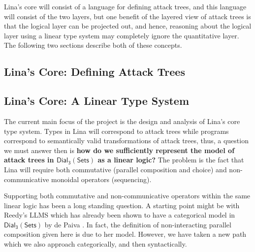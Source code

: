 \documentclass{sigplanconf}
\newcommand{\dial}[0]{\mathsf{Dial_3}(\mathsf{Sets})}
\begin{document}
Lina's core will consist of a language for defining attack trees, and
this language will consist of the two layers, but one benefit of the
layered view of attack trees is that the logical layer can be
projected out, and hence, reasoning about the logical layer using a
linear type system may completely ignore the quantitative layer.  The
following two sections describe both of these concepts.

\subsection{Lina's Core: Defining Attack Trees}
\label{subsec:linas_core_defining_attack_trees}




\subsection{Lina's Core: A Linear Type System}
\label{subsec:linas_core_linear_type_system}

The current main focus of the project is the design and analysis of
Lina's core type system.  Types in Lina will correspond to attack
trees while programs correspond to semantically valid transformations
of attack trees, thus, a question we must answer then is \textbf{how
  do we sufficiently represent the model of attack trees in $\dial$ as
  a linear logic?}  The problem is the fact that Lina will require
both commutative (parallel composition and choice) and
non-communicative monoidal operators (sequencing).

Supporting both commutative and non-communicative operators within the
same linear logic has been a long standing question.  A starting point
might be with Reedy's LLMS which has already been shown to have a
categorical model in $\dial$ by de Paiva \cite{dePaiva:2014a}.  In
fact, the definition of non-interacting parallel composition given
here is due to her model.  However, we have taken a new path which we
also approach categorically, and then syntactically.

\end{document}
